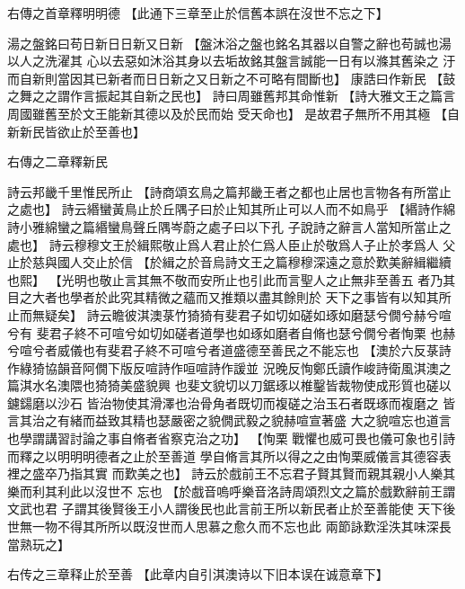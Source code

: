 \documentclass{zhvt-classic}
\begin{document}
\begin{preface}
右傳之首章釋明明德
  【此通下三章至止於信舊本誤在沒世不忘之下】
\end{preface}

湯之盤銘曰苟日新日日新又日新
  【盤沐浴之盤也銘名其器以自警之辭也苟誠也湯以人之洗濯其
    心以去惡如沐浴其身以去垢故銘其盤言誠能一日有以滌其舊染之
    汙而自新則當因其已新者而日日新之又日新之不可略有間斷也】
康誥曰作新民
  【鼓之舞之之謂作言振起其自新之民也】
詩曰周雖舊邦其命惟新
  【詩大雅文王之篇言周國雖舊至於文王能新其德以及於民而始
    受天命也】
是故君子無所不用其極
  【自新新民皆欲止於至善也】

\begin{preface}
右傳之二章釋新民
\end{preface}

詩云邦畿千里惟民所止
  【詩商頌玄鳥之篇邦畿王者之都也止居也言物各有所當止之處也】
詩云緡蠻黃鳥止於丘隅子曰於止知其所止可以人而不如鳥乎
  【緡詩作綿詩小雅綿蠻之篇緡蠻鳥聲丘隅岑蔚之處子曰以下孔
    子說詩之辭言人當知所當止之處也】
詩云穆穆文王於緝熙敬止爲人君止於仁爲人臣止於敬爲人子止於孝爲人
父止於慈與國人交止於信
  【於緝之於音烏詩文王之篇穆穆深遠之意於歎美辭緝繼續也熙】
  \zhvph【光明也敬止言其無不敬而安所止也引此而言聖人之止無非至善五
    者乃其目之大者也學者於此究其精微之蘊而又推類以盡其餘則於
    天下之事皆有以知其所止而無疑矣】
詩云瞻彼淇澳菉竹猗猗有斐君子如切如磋如琢如磨瑟兮僩兮赫兮喧兮有
斐君子終不可喧兮如切如磋者道學也如琢如磨者自脩也瑟兮僩兮者恂栗
也赫兮喧兮者威儀也有斐君子終不可喧兮者道盛德至善民之不能忘也
  【澳於六反菉詩作綠猗協韻音阿僩下版反喧詩作咺喧詩作諼並
    況晚反恂鄭氏讀作峻詩衛風淇澳之篇淇水名澳隈也猗猗美盛貌興
    也斐文貌切以刀鋸琢以椎鑿皆裁物使成形質也磋以鑢鐋磨以沙石
    皆治物使其滑澤也治骨角者既切而複磋之治玉石者既琢而複磨之
    皆言其治之有緒而益致其精也瑟嚴密之貌僩武毅之貌赫喧宣著盛
    大之貌喧忘也道言也學謂講習討論之事自脩者省察克治之功】
    \zhvph【恂栗
    戰懼也威可畏也儀可象也引詩而釋之以明明明德者之止於至善道
    學自脩言其所以得之之由恂栗威儀言其德容表裡之盛卒乃指其實
    而歎美之也】
詩云於戲前王不忘君子賢其賢而親其親小人樂其樂而利其利此以沒世不
忘也
  【於戲音嗚呼樂音洛詩周頌烈文之篇於戲歎辭前王謂文武也君
    子謂其後賢後王小人謂後民也此言前王所以新民者止於至善能使
    天下後世無一物不得其所所以既沒世而人思慕之愈久而不忘也此
    兩節詠歎淫泆其味深長當熟玩之】

\begin{preface}
右传之三章释止於至善
  【此章内自引淇澳诗以下旧本误在诚意章下】
\end{preface}
\end{document}
